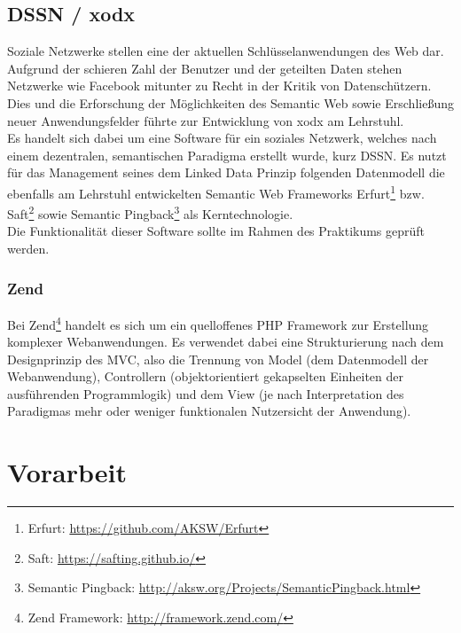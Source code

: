\documentclass{article}
\begin{document}
\subsection{DSSN / xodx}

Soziale Netzwerke stellen eine der aktuellen Schlüsselanwendungen des Web dar. Aufgrund der schieren Zahl der Benutzer und der geteilten Daten stehen Netzwerke wie Facebook mitunter zu Recht in der Kritik von Datenschützern. Dies und die Erforschung der Möglichkeiten des Semantic Web sowie Erschließung neuer Anwendungsfelder führte zur Entwicklung von xodx\cite{xodx_paper} am Lehrstuhl.\\
Es handelt sich dabei um eine Software für ein soziales Netzwerk, welches nach einem dezentralen, semantischen Paradigma erstellt wurde, kurz DSSN. Es nutzt für das Management seines dem Linked Data Prinzip folgenden Datenmodell die ebenfalls am Lehrstuhl entwickelten Semantic Web Frameworks Erfurt\footnote{Erfurt: \url{https://github.com/AKSW/Erfurt}} bzw. Saft\footnote{Saft: \url{https://safting.github.io/}} sowie Semantic Pingback\footnote{Semantic Pingback: \url{http://aksw.org/Projects/SemanticPingback.html}} als Kerntechnologie.\\
Die Funktionalität dieser Software sollte im Rahmen des Praktikums geprüft werden.

\subsubsection{Zend}

Bei Zend\footnote{Zend Framework: \url{http://framework.zend.com/}} handelt es sich um ein quelloffenes PHP Framework zur Erstellung komplexer Webanwendungen. Es verwendet dabei eine Strukturierung nach dem Designprinzip des MVC, also die Trennung von Model (dem Datenmodell der Webanwendung), Controllern (objektorientiert gekapselten Einheiten der ausführenden Programmlogik) und dem View (je nach Interpretation des Paradigmas mehr oder weniger funktionalen Nutzersicht der Anwendung).

\section{Vorarbeit}
\end{document}
